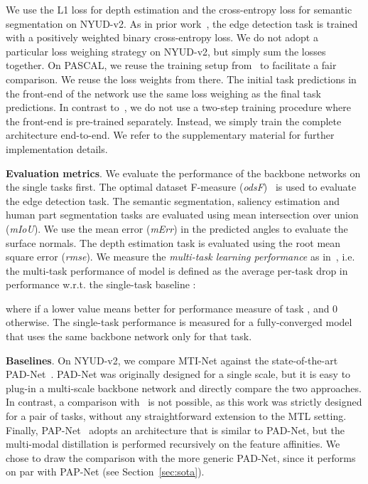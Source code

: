 \documentclass[runningheads]{llncs}
\begin{document}
We use the L1 loss for depth estimation and the cross-entropy loss for semantic segmentation on NYUD-v2. As in prior work~\cite{kokkinos2015pushing,maninis2017convolutional,maninis2019attentive}, the edge detection task is trained with a positively weighted  binary cross-entropy loss. We do not adopt a particular loss weighing strategy on NYUD-v2, but simply sum the losses together. On PASCAL, we reuse the training setup from~\cite{maninis2019attentive} to facilitate a fair comparison. We reuse the loss weights from there. The initial task predictions in the front-end of the network use the same loss weighing as the final task predictions. In contrast to~\cite{xu2018pad,zhang2019pattern,zhang2018joint}, we do not use a two-step training procedure where the front-end is pre-trained separately. Instead, we simply train the complete architecture end-to-end. We refer to the supplementary material for further implementation details. 

\noindent\textbf{Evaluation metrics}.
We evaluate the performance of the backbone networks on the single tasks first. The optimal dataset F-measure (\textit{odsF})~\cite{martin2004learning} is used to evaluate the edge detection task. The semantic segmentation, saliency estimation and human part segmentation tasks are evaluated using mean intersection over union (\textit{mIoU}). We use the mean error (\textit{mErr}) in the predicted angles to evaluate the surface normals. The depth estimation task is evaluated using the root mean square error (\textit{rmse}). We measure the \textit{multi-task learning performance } as in~\cite{maninis2019attentive}, i.e. the multi-task performance of model  is defined as the average per-task drop in performance w.r.t. the single-task baseline :

where  if a lower value means better for performance measure  of task , and 0 otherwise. The single-task performance is measured for a fully-converged model that uses the same backbone network only for that task.

\noindent\textbf{Baselines}.
On NYUD-v2, we compare MTI-Net against the state-of-the-art PAD-Net~\cite{xu2018pad}. PAD-Net was originally designed for a single scale, but it is easy to plug-in a multi-scale backbone network and directly compare the two approaches. In contrast, a comparison with~\cite{zhang2018joint} is not possible, as this work was strictly designed for a pair of tasks, without any straightforward extension to the MTL setting. Finally, PAP-Net~\cite{zhang2019pattern} adopts an architecture that is similar to PAD-Net, but the multi-modal distillation is performed recursively on the feature affinities. We chose to draw the comparison with the more generic PAD-Net, since it performs on par with PAP-Net (see Section~\ref{sec:sota}). 
\end{document}
